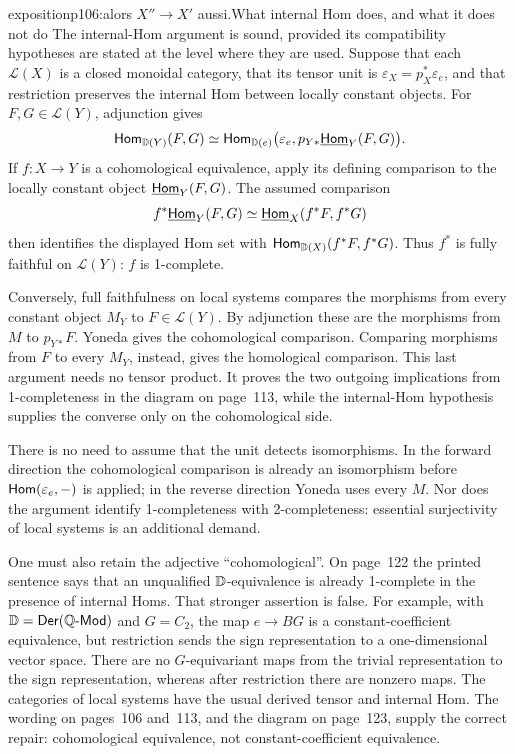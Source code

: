 \begin{dcomment}{exposition}{p106:alors $X'' \to X'$ aussi.}{What internal Hom does, and what it does not do}
The internal-Hom argument is sound, provided its compatibility hypotheses are stated at the level where they are used. Suppose that each $\mathcal L(X)$ is a closed monoidal category, that its tensor unit is $\varepsilon_X=p_X^*\varepsilon_e$, and that restriction preserves the internal Hom between locally constant objects. For $F,G\in\mathcal L(Y)$, adjunction gives
\[
 \mathsf{Hom}_{\mathbb{D}(Y)}(F,G)
 \simeq\mathsf{Hom}_{\mathbb{D}(e)}\bigl(\varepsilon_e,
                p_{Y*}\underline{\mathsf{Hom}}_Y(F,G)\bigr).
\]
If $f:X\to Y$ is a cohomological equivalence, apply its defining comparison to the locally constant object $\underline{\mathsf{Hom}}_Y(F,G)$. The assumed comparison
\[
 f^*\underline{\mathsf{Hom}}_Y(F,G)
 \simeq\underline{\mathsf{Hom}}_X(f^*F,f^*G)
\]
then identifies the displayed Hom set with $\mathsf{Hom}_{\mathbb{D}(X)}(f^*F,f^*G)$. Thus $f^*$ is fully faithful on $\mathcal L(Y)$: $f$ is 1-complete.

Conversely, full faithfulness on local systems compares the morphisms from every constant object $M_Y$ to $F\in\mathcal L(Y)$. By adjunction these are the morphisms from $M$ to $p_{Y*}F$. Yoneda gives the cohomological comparison. Comparing morphisms from $F$ to every $M_Y$, instead, gives the homological comparison. This last argument needs no tensor product. It proves the two outgoing implications from 1-completeness in the diagram on page~113, while the internal-Hom hypothesis supplies the converse only on the cohomological side.

There is no need to assume that the unit detects isomorphisms. In the forward direction the cohomological comparison is already an isomorphism before $\mathsf{Hom}(\varepsilon_e,-)$ is applied; in the reverse direction Yoneda uses every $M$. Nor does the argument identify 1-completeness with 2-completeness: essential surjectivity of local systems is an additional demand.

One must also retain the adjective ``cohomological''. On page~122 the printed sentence says that an unqualified $\mathbb{D}$-equivalence is already 1-complete in the presence of internal Homs. That stronger assertion is false. For example, with $\mathbb{D}=\mathsf{Der}(\mathbb Q\text{-}\mathsf{Mod})$ and $G=C_2$, the map $e\to BG$ is a constant-coefficient equivalence, but restriction sends the sign representation to a one-dimensional vector space. There are no $G$-equivariant maps from the trivial representation to the sign representation, whereas after restriction there are nonzero maps. The categories of local systems have the usual derived tensor and internal Hom. The wording on pages~106 and~113, and the diagram on page~123, supply the correct repair: cohomological equivalence, not constant-coefficient equivalence.
\end{dcomment}


